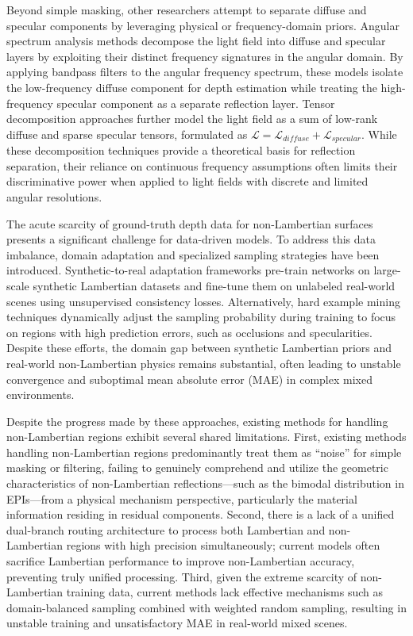 \documentclass[lettersize,journal]{IEEEtran}
\begin{document}
Beyond simple masking, other researchers attempt to separate diffuse and specular components by leveraging physical or frequency-domain priors. Angular spectrum analysis methods decompose the light field into diffuse and specular layers by exploiting their distinct frequency signatures in the angular domain. By applying bandpass filters to the angular frequency spectrum, these models isolate the low-frequency diffuse component for depth estimation while treating the high-frequency specular component as a separate reflection layer. Tensor decomposition approaches further model the light field as a sum of low-rank diffuse and sparse specular tensors, formulated as $\mathcal{L} = \mathcal{L}_{diffuse} + \mathcal{L}_{specular}$. While these decomposition techniques provide a theoretical basis for reflection separation, their reliance on continuous frequency assumptions often limits their discriminative power when applied to light fields with discrete and limited angular resolutions.

The acute scarcity of ground-truth depth data for non-Lambertian surfaces presents a significant challenge for data-driven models. To address this data imbalance, domain adaptation and specialized sampling strategies have been introduced. Synthetic-to-real adaptation frameworks \cite{he2016} pre-train networks on large-scale synthetic Lambertian datasets and fine-tune them on unlabeled real-world scenes using unsupervised consistency losses. Alternatively, hard example mining techniques dynamically adjust the sampling probability during training to focus on regions with high prediction errors, such as occlusions and specularities. Despite these efforts, the domain gap between synthetic Lambertian priors and real-world non-Lambertian physics remains substantial, often leading to unstable convergence and suboptimal mean absolute error (MAE) in complex mixed environments.

Despite the progress made by these approaches, existing methods for handling non-Lambertian regions exhibit several shared limitations. First, existing methods handling non-Lambertian regions predominantly treat them as ``noise'' for simple masking or filtering, failing to genuinely comprehend and utilize the geometric characteristics of non-Lambertian reflections---such as the bimodal distribution in EPIs---from a physical mechanism perspective, particularly the material information residing in residual components. Second, there is a lack of a unified dual-branch routing architecture to process both Lambertian and non-Lambertian regions with high precision simultaneously; current models often sacrifice Lambertian performance to improve non-Lambertian accuracy, preventing truly unified processing. Third, given the extreme scarcity of non-Lambertian training data, current methods lack effective mechanisms such as domain-balanced sampling combined with weighted random sampling, resulting in unstable training and unsatisfactory MAE in real-world mixed scenes.
\end{document}

